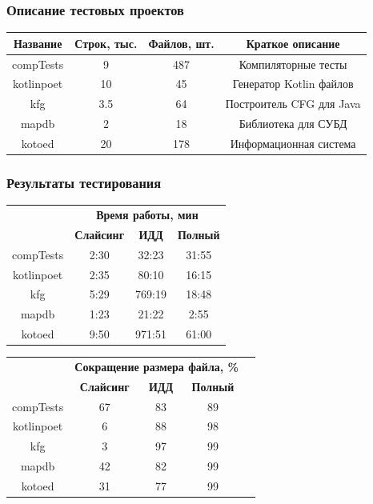 \begin{frame}[fragile]
	\frametitle{Описание тестовых проектов}
\begin{table}[]
\center
\small{
\begin{tabular}{| c | c | c | c |}
\hline
\bf Название & \bf Строк, тыс. & \bf Файлов, шт. & \bf Краткое описание \\
\hline
compTests & 9 & 487 & Компиляторные тесты\\
\hline
kotlinpoet & 10 & 45 & Генератор Kotlin файлов\\
\hline
kfg & 3.5 & 64 & Построитель CFG для Java\\
\hline
mapdb & 2 & 18 & Библиотека для СУБД\\
\hline
kotoed & 20 & 178 & Информационная система\\
\hline
\end{tabular}
}
\end{table}
\end{frame}



\begin{frame}
	\frametitle{Результаты тестирования}
	\begin{table}[]
\footnotesize
\begin{tabular}{| c | c | c | c |}
\hline
\bf \multirow{2}{*}{Проект} & \multicolumn{3}{|c|}{\bf Время работы, мин} \\
\cline{2-4}
& \bf Слайсинг &  \bf ИДД & \bf Полный \\
\hline
compTests & 2:30  & 32:23 & 31:55 \\
\hline
kotlinpoet & 2:35 & 80:10 & 16:15 \\
\hline
kfg & 5:29 & 769:19 & 18:48 \\
\hline
mapdb & 1:23 & 21:22 & 2:55 \\
\hline
kotoed & 9:50 & 971:51 & 61:00\\
\hline
\end{tabular}
\end{table}

	\begin{table}[]
\footnotesize
\begin{tabular}{| c | c | c | c | c |}
\hline
\bf \multirow{2}{*}{Проект} & \multicolumn{3}{|c|}{\bf Сокращение размера файла, \%} \\
\cline{2-4}
& \bf Слайсинг &  \bf ИДД & \bf Полный \\
\hline
compTests & 67  & 83 & 89 \\
\hline
kotlinpoet & 6 & 88 & 98 \\
\hline
kfg & 3 & 97 & 99 \\
\hline
mapdb & 42 & 82 & 99 \\
\hline
kotoed & 31 & 77 & 99\\
\hline
\end{tabular}
\end{table}


\end{frame}


